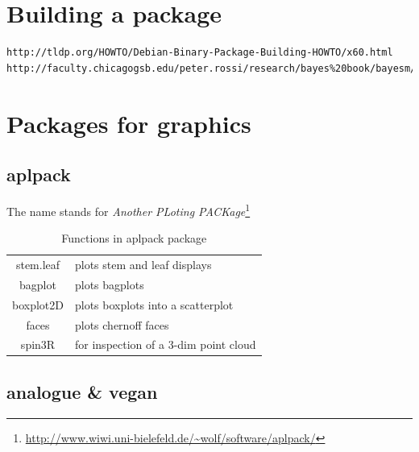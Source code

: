 \section{Building a package}
\label{sec:building-package}

\begin{verbatim}
http://tldp.org/HOWTO/Debian-Binary-Package-Building-HOWTO/x60.html 
http://faculty.chicagogsb.edu/peter.rossi/research/bayes%20book/bayesm/Making%20R%20Packages%20Under%20Windows.pdf 
\end{verbatim}

\section{Packages for graphics}
\label{sec:packages-graphics}

\subsection{aplpack}
\label{sec:aplpack}


The name stands for {\it Another PLoting PACKage}\footnote{\url{http://www.wiwi.uni-bielefeld.de/~wolf/software/aplpack/}}

\begin{table}
\begin{center}
  \begin{tabular}{cl}
    
    stem.leaf & plots stem and leaf displays  \\
    bagplot &  plots bagplots  \\
    boxplot2D &  plots boxplots into a scatterplot  \\
    faces  & plots chernoff faces  \\
    spin3R &  for inspection of a 3-dim point cloud \\
  \end{tabular}
\end{center}
\caption{Functions in aplpack package}
\label{tab:aplpack}
\end{table}

\subsection{analogue \& vegan}
\label{sec:analogue--vegan}

